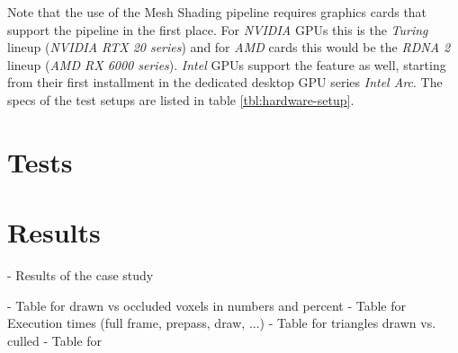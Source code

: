 \noindent
Note that the use of the Mesh Shading pipeline requires graphics cards that support the pipeline in the first place. 
For \emph{NVIDIA} \ac{GPU}s this is the \emph{Turing} lineup (\emph{NVIDIA RTX 20 series}) and for \emph{AMD} cards 
this would be the \emph{RDNA 2} lineup (\emph{AMD RX 6000 series}). \emph{Intel} \ac{GPU}s support the feature as 
well, starting from their first installment in the dedicated desktop \ac{GPU} series \emph{Intel Arc}. The specs of 
the test setups are listed in table \ref{tbl:hardware-setup}.




%
%
%
%
%
%


\section{Tests}






\section{Results}

- Results of the case study

- Table for drawn vs occluded voxels in numbers and percent
- Table for Execution times (full frame, prepass, draw, ...)
- Table for triangles drawn vs. culled 
- Table for 
